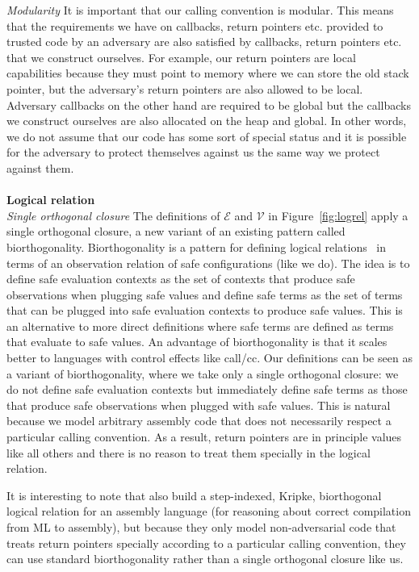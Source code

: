\documentclass[compsoc,conference,letterpaper,fleqn]{IEEEtran}
\newcommand{\asmType}{\plaindom{AsmType}}
\newcommand{\plaindom}[1]{\mathrm{#1}}
\newcommand{\intr}[2]{\mathcal{#1}}
\newcommand{\valueintr}[1]{\intr{V}{#1}}
\newcommand{\exprintr}[1]{\intr{E}{#1}}
\newcommand{\stdvr}{\valueintr{\asmType}}
\newcommand{\stder}{\exprintr{\asmType}}
\begin{document}
\emph{Modularity} It is important that our calling convention is modular.
This means that the requirements we have on callbacks, return
pointers etc. provided to trusted code by an adversary are also satisfied by
callbacks, return pointers etc. that we construct ourselves. For example, our
return pointers are local capabilities because they must point to
memory where we can store the old stack pointer, but the adversary's return
pointers are also allowed to be local. Adversary callbacks on the other hand are
required to be global but the callbacks we construct ourselves are also
allocated on the heap and global. In other words, we do not assume that our code
has some sort of special status and it is possible for the adversary to protect
themselves against us the same way we protect against them.
\\\\
\noindent\textbf{Logical relation}\\
\emph{Single orthogonal closure} The definitions of $\stder$ and $\stdvr$ in
Figure~\ref{fig:logrel} apply a single orthogonal closure, a new variant of an
existing pattern called biorthogonality. Biorthogonality is a pattern for
defining logical relations~\citep{krivine_classical_1994,pitts_operational_1998}
in terms of an observation relation of safe configurations (like we do). The
idea is to define safe evaluation contexts as the set of contexts that produce
safe observations when plugging safe values and define safe terms as the set of
terms that can be plugged into safe evaluation contexts to produce safe values.
This is an alternative to more direct definitions where safe terms are defined
as terms that evaluate to safe values. An advantage of biorthogonality is that
it scales better to languages with control effects like call/cc. Our definitions
can be seen as a variant of biorthogonality, where we take only a single
orthogonal closure: we do not define safe evaluation contexts but immediately
define safe terms as those that produce safe observations when plugged with safe
values. This is natural because we model arbitrary assembly code that does not
necessarily respect a particular calling convention. As a result, return
pointers are in principle values like all others and there is no reason to treat
them specially in the logical relation.

It is interesting to note that \citet{Hur:2011:KLR:1926385.1926402} also build a
step-indexed, Kripke, biorthogonal logical relation for an assembly language
(for reasoning about correct compilation from ML to assembly), but because they
only model non-adversarial code that treats return pointers specially according
to a particular calling convention, they can use standard biorthogonality rather
than a single orthogonal closure like us.
\end{document}
